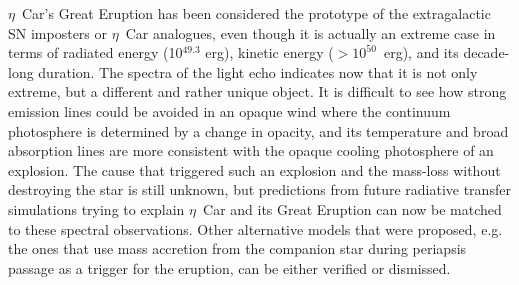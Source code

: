 $\eta$~Car's Great Eruption has been considered the prototype of the
extragalactic SN imposters or $\eta$~Car analogues, even though it is
actually an extreme case in terms of radiated energy (10$^{49.3}$
erg), kinetic energy ($>$$10^{50}$~erg), and its decade-long
duration\cite{Smith11}. The spectra of the light echo indicates now
that it is not only extreme, but a different and rather unique object.
It is difficult to see how strong emission lines could be avoided in
an opaque wind where the continuum photosphere is determined by a
change in opacity, and its temperature and broad absorption lines are
more consistent with the opaque cooling photosphere of an explosion.
The cause that triggered such an explosion and the mass-loss without
destroying the star is still unknown, but predictions from future
radiative transfer simulations trying to explain $\eta$~Car and its
Great Eruption can now be matched to these spectral observations.
Other alternative models that were proposed, e.g. the ones that use
mass accretion 
from the companion star during periapsis passage as a
trigger for the eruption\cite{Kashi10_ngc300}, can be either verified
or dismissed. 





